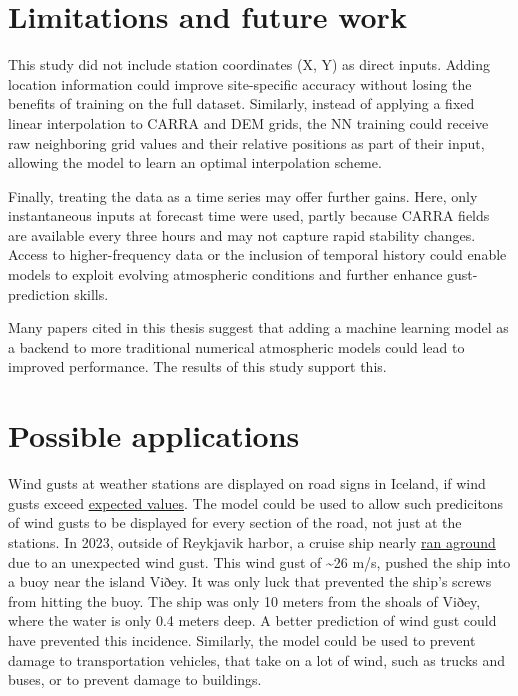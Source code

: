 \section{Limitations and future work}
This study did not include station coordinates (X, Y) as direct inputs. Adding location information could improve site-specific accuracy without losing the benefits of training on the full dataset. Similarly, instead of applying a fixed linear interpolation to CARRA and DEM grids, the NN training could receive raw neighboring grid values and their relative positions as part of their input, allowing the model to learn an optimal interpolation scheme.

Finally, treating the data as a time series may offer further gains. Here, only instantaneous inputs at forecast time were used, partly because CARRA fields are available every three hours and may not capture rapid stability changes. Access to higher-frequency data or the inclusion of temporal history could enable models to exploit evolving atmospheric conditions and further enhance gust-prediction skills.

Many papers cited in this thesis suggest that adding a machine learning model as a backend to more traditional numerical atmospheric models could lead to improved performance. The results of this study support this.

\section{Possible applications}
Wind gusts at weather stations are displayed on road signs in Iceland, if wind gusts exceed \href{https://www.vegagerdin.is/vegagerdin/starfsemi/frettir/tvo-ny-vedur-og-upplysingaskilti-i-notkun#}{expected values}. The model could be used to allow such predicitons of wind gusts to be displayed for every section of the road, not just at the stations. In 2023, outside of Reykjavik harbor, a cruise ship nearly \href{https://www.mbl.is/200milur/frettir/2024/04/26/strand_skemmtiferdaskips_kallar_a_erlenda_adstod/}{ran aground} due to an unexpected wind gust. This wind gust of \textasciitilde 26 m/s, pushed the ship into a buoy near the island Viðey. It was only luck that prevented the ship's screws from hitting the buoy. The ship was only 10 meters from the shoals of Viðey, where the water is only 0.4 meters deep. A better prediction of wind gust could have prevented this incidence. Similarly, the model could be used to prevent damage to transportation vehicles, that take on a lot of wind, such as trucks and buses, or to prevent damage to buildings.

